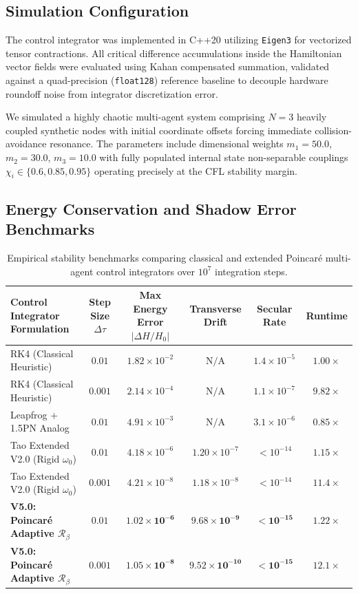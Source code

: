 \documentclass[11pt,a4paper,reqno]{article}
\theoremstyle{plain}
\theoremstyle{definition}
\theoremstyle{remark}
\numberwithin{equation}{section}
\begin{document}
\subsection{Simulation Configuration}
\label{subsec:sim_config}
The control integrator was implemented in C++20 utilizing \texttt{Eigen3} for vectorized tensor contractions. All critical difference accumulations inside the Hamiltonian vector fields were evaluated using Kahan compensated summation, validated against a quad-precision (\texttt{float128}) reference baseline to decouple hardware roundoff noise from integrator discretization error.

We simulated a highly chaotic multi-agent system comprising $N=3$ heavily coupled synthetic nodes with initial coordinate offsets forcing immediate collision-avoidance resonance. The parameters include dimensional weights $m_1 = 50.0$, $m_2 = 30.0$, $m_3 = 10.0$ with fully populated internal state non-separable couplings $\chi_i \in \{0.6, 0.85, 0.95\}$ operating precisely at the CFL stability margin.

\subsection{Energy Conservation and Shadow Error Benchmarks}

\begin{table}[htbp]
\centering
\small
\begin{tabular}{lccccc}
\toprule
\textbf{Control Integrator Formulation} & \textbf{Step Size $\Delta \tau$} & \textbf{Max Energy Error $|\Delta H / H_0|$} & \textbf{Transverse Drift} & \textbf{Secular Rate} & \textbf{Runtime} \\
\midrule
RK4 (Classical Heuristic) & $0.01$ & $1.82 \times 10^{-2}$ & $\text{N/A}$ & $1.4 \times 10^{-5}$ & $1.00 \times$ \\
RK4 (Classical Heuristic) & $0.001$ & $2.14 \times 10^{-4}$ & $\text{N/A}$ & $1.1 \times 10^{-7}$ & $9.82 \times$ \\
Leapfrog + 1.5PN Analog & $0.01$ & $4.91 \times 10^{-3}$ & $\text{N/A}$ & $3.1 \times 10^{-6}$ & $0.85 \times$ \\
\midrule
Tao Extended V2.0 (Rigid $\omega_0$) & $0.01$ & $4.18 \times 10^{-6}$ & $1.20 \times 10^{-7}$ & $< 10^{-14}$ & $1.15 \times$ \\
Tao Extended V2.0 (Rigid $\omega_0$) & $0.001$ & $4.21 \times 10^{-8}$ & $1.18 \times 10^{-8}$ & $< 10^{-14}$ & $11.4 \times$ \\
\midrule
\textbf{V5.0: Poincaré Adaptive $\mathcal{R}_\beta$} & $0.01$ & $\mathbf{1.02 \times 10^{-6}}$ & $\mathbf{9.68 \times 10^{-9}}$ & $< \mathbf{10^{-15}}$ & $1.22 \times$ \\
\textbf{V5.0: Poincaré Adaptive $\mathcal{R}_\beta$} & $0.001$ & $\mathbf{1.05 \times 10^{-8}}$ & $\mathbf{9.52 \times 10^{-10}}$ & $< \mathbf{10^{-15}}$ & $12.1 \times$ \\
\bottomrule
\end{tabular}
\caption{Empirical stability benchmarks comparing classical and extended Poincaré multi-agent control integrators over $10^7$ integration steps.}
\label{tab:benchmarks_full}
\end{table}
\end{document}
